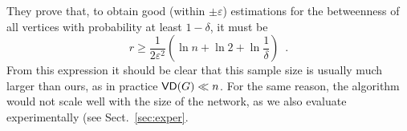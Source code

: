 They prove that, to obtain good (within $\pm\varepsilon$) estimations for the
betweenness of all vertices with probability at least $1-\delta$, it must be
\[
r\geq \frac{1}{2\varepsilon^2}\left(\ln n + \ln 2 +\ln\frac{1}{\delta}\right)\enspace.
\]
From this expression it should be clear that this sample size is usually much
larger than ours, as in practice $\mathsf{VD}(G)\ll n$. For the same reason, the
algorithm would not scale well with the size of the network, as we also evaluate
experimentally (see Sect.~\ref{sec:exper}.

